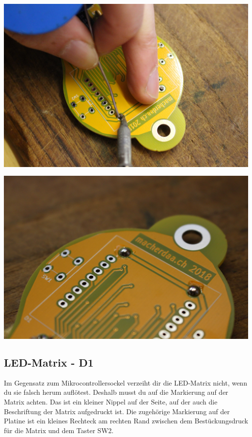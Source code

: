 \documentclass{article}
\begin{document}
\begin{minipage}[b]{0.5\textwidth}
	\includegraphics[width=\textwidth]{Bilder/IMG_5569.JPG}
\end{minipage}
\begin{minipage}[b]{0.5\textwidth}
	\includegraphics[width=\textwidth]{Bilder/IMG_5573.JPG}
\end{minipage}

\subsection{LED-Matrix - D1}

Im Gegensatz zum Mikrocontrollersockel verzeiht dir die LED-Matrix nicht, wenn du sie falsch herum auflötest. Deshalb musst du auf die Markierung auf der Matrix achten. Das ist ein kleiner Nippel auf der Seite, auf der auch die Beschriftung der Matrix aufgedruckt ist. Die zugehörige Markierung auf der Platine ist ein kleines Rechteck am rechten Rand zwischen dem Bestückungsdruck für die Matrix und dem Taster SW2.
\end{document}
